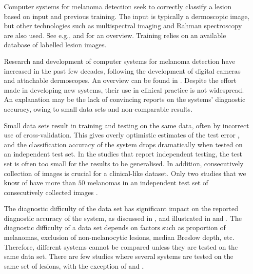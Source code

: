 \documentclass[a4paper,12pt]{article}
\begin{document}
Computer systems for melanoma detection seek to correctly classify a lesion based on input and previous training. 
The input is typically a dermoscopic image, but other technologies such as multispectral imaging and Rahman spectroscopy are also used. 
See e.g., \cite{Fink2016Noninvasive} and \cite{Masood2013Computer} for an overview. 
Training relies on an available database of labelled lesion images. 

Research and development of computer systems for melanoma detection have increased in the past few decades, following the development of digital cameras and attachable dermoscopes. 
An overview can be found in \cite{Korotkov2012Computerized}. 
Despite the effort made in developing new systems, their use in clinical practice is not widespread. 
An explanation may be the lack of convincing reports on the systems' diagnostic accuracy, owing to small data sets and non-comparable results. 

Small data sets result in training and testing on the same data, often by incorrect use of cross-validation. 
This gives overly optimistic estimates of the test error \citep{Smialowski2010Pitfalls,Hastie2009Elements}, and the classification accuracy of the system drops dramatically when tested on an independent test set. 
In the studies that report independent testing, the test set is often too small for the results to be generalised. 
In addition, consecutively collection of images is crucial for a clinical-like dataset. 
Only two studies that we know of have more than $50$ melanomas in an independent test set of consecutively collected images \citep{Monheit2011Performance, Malvehy2014Clinical}. 

The diagnostic difficulty of the data set has significant impact on the reported diagnostic accuracy of the system, as discussed in \cite{Rosado2003Accuracy}, and illustrated in \cite{Malvehy2014Clinical} and \cite{Mollersen2015Computeraided}. 
The diagnostic difficulty of a data set depends on factors such as proportion of melanomas, exclusion of non-melanocytic lesions, median Breslow depth, etc. 
Therefore, different systems cannot be compared unless they are tested on the same data set. 
There are few studies where several systems are tested on the same set of lesions, with the exception of \cite{Perrinaud2007Can} and \cite{Mollersen2015Computeraided}. 
\end{document}
